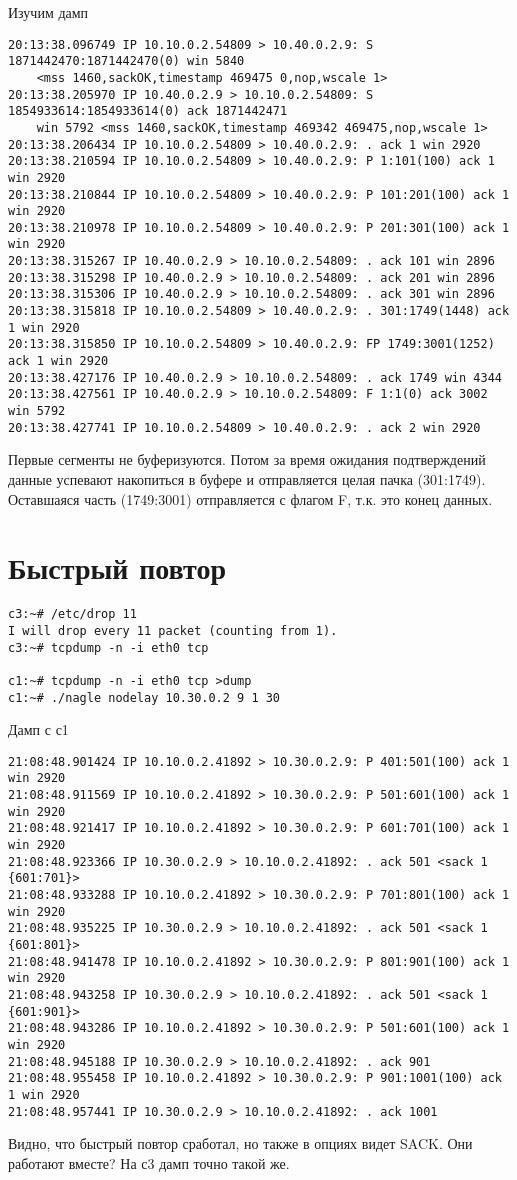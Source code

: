 \documentclass[a4paper,12pt]{article}
\begin{document}
Изучим дамп
\begin{Verbatim}
20:13:38.096749 IP 10.10.0.2.54809 > 10.40.0.2.9: S 1871442470:1871442470(0) win 5840 
	<mss 1460,sackOK,timestamp 469475 0,nop,wscale 1>
20:13:38.205970 IP 10.40.0.2.9 > 10.10.0.2.54809: S 1854933614:1854933614(0) ack 1871442471 
	win 5792 <mss 1460,sackOK,timestamp 469342 469475,nop,wscale 1>
20:13:38.206434 IP 10.10.0.2.54809 > 10.40.0.2.9: . ack 1 win 2920 
20:13:38.210594 IP 10.10.0.2.54809 > 10.40.0.2.9: P 1:101(100) ack 1 win 2920 
20:13:38.210844 IP 10.10.0.2.54809 > 10.40.0.2.9: P 101:201(100) ack 1 win 2920 
20:13:38.210978 IP 10.10.0.2.54809 > 10.40.0.2.9: P 201:301(100) ack 1 win 2920 
20:13:38.315267 IP 10.40.0.2.9 > 10.10.0.2.54809: . ack 101 win 2896 
20:13:38.315298 IP 10.40.0.2.9 > 10.10.0.2.54809: . ack 201 win 2896 
20:13:38.315306 IP 10.40.0.2.9 > 10.10.0.2.54809: . ack 301 win 2896 
20:13:38.315818 IP 10.10.0.2.54809 > 10.40.0.2.9: . 301:1749(1448) ack 1 win 2920 
20:13:38.315850 IP 10.10.0.2.54809 > 10.40.0.2.9: FP 1749:3001(1252) ack 1 win 2920 
20:13:38.427176 IP 10.40.0.2.9 > 10.10.0.2.54809: . ack 1749 win 4344 
20:13:38.427561 IP 10.40.0.2.9 > 10.10.0.2.54809: F 1:1(0) ack 3002 win 5792 
20:13:38.427741 IP 10.10.0.2.54809 > 10.40.0.2.9: . ack 2 win 2920 
\end{Verbatim}
Первые сегменты не буферизуются. Потом за время ожидания подтверждений данные успевают накопиться в буфере и отправляется целая пачка (301:1749).
Оставшаяся часть (1749:3001) отправляется с флагом F, т.к. это конец данных.

\section{Быстрый повтор}

\begin{Verbatim}
c3:~# /etc/drop 11
I will drop every 11 packet (counting from 1).
c3:~# tcpdump -n -i eth0 tcp

c1:~# tcpdump -n -i eth0 tcp >dump
c1:~# ./nagle nodelay 10.30.0.2 9 1 30
\end{Verbatim}

Дамп с с1
\begin{Verbatim}
21:08:48.901424 IP 10.10.0.2.41892 > 10.30.0.2.9: P 401:501(100) ack 1 win 2920 
21:08:48.911569 IP 10.10.0.2.41892 > 10.30.0.2.9: P 501:601(100) ack 1 win 2920 
21:08:48.921417 IP 10.10.0.2.41892 > 10.30.0.2.9: P 601:701(100) ack 1 win 2920 
21:08:48.923366 IP 10.30.0.2.9 > 10.10.0.2.41892: . ack 501 <sack 1 {601:701}>
21:08:48.933288 IP 10.10.0.2.41892 > 10.30.0.2.9: P 701:801(100) ack 1 win 2920 
21:08:48.935225 IP 10.30.0.2.9 > 10.10.0.2.41892: . ack 501 <sack 1 {601:801}>
21:08:48.941478 IP 10.10.0.2.41892 > 10.30.0.2.9: P 801:901(100) ack 1 win 2920
21:08:48.943258 IP 10.30.0.2.9 > 10.10.0.2.41892: . ack 501 <sack 1 {601:901}>
21:08:48.943286 IP 10.10.0.2.41892 > 10.30.0.2.9: P 501:601(100) ack 1 win 2920
21:08:48.945188 IP 10.30.0.2.9 > 10.10.0.2.41892: . ack 901
21:08:48.955458 IP 10.10.0.2.41892 > 10.30.0.2.9: P 901:1001(100) ack 1 win 2920
21:08:48.957441 IP 10.30.0.2.9 > 10.10.0.2.41892: . ack 1001 
\end{Verbatim}
Видно, что быстрый повтор сработал, но также в опциях видет SACK. Они работают вместе?
На с3 дамп точно такой же.
\end{document}
